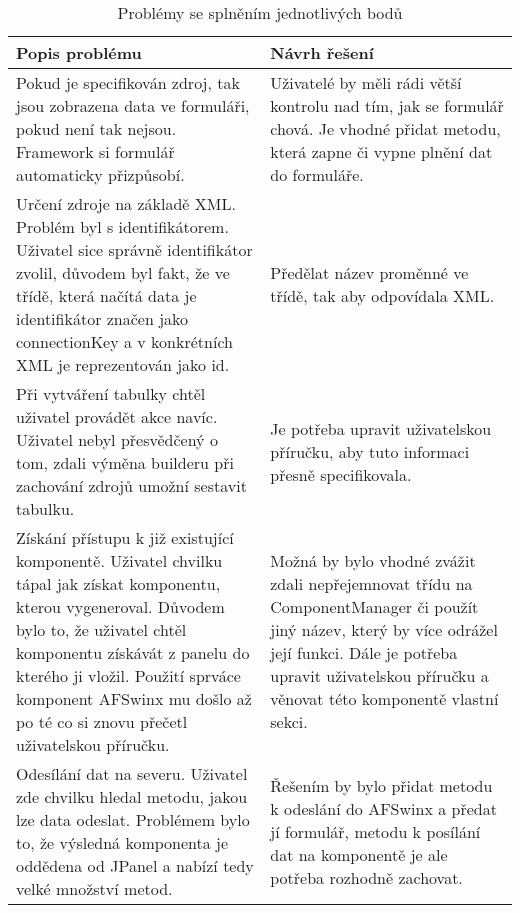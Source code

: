 \begin{table}[width=\linewidth]
\begin{center}
\caption{Problémy se splněním jednotlivých bodů}
\label{table:userTestResult}
\begin{tabular}{|p{7cm}|p{7cm}|}
\hline
\textbf{Popis problému} & \textbf{Návrh řešení} \\
\hline
Pokud je specifikován zdroj, tak jsou zobrazena data ve formuláři, pokud není tak nejsou. Framework si formulář automaticky přizpůsobí. & 
Uživatelé by měli rádi větší kontrolu nad tím, jak se formulář chová. Je vhodné přidat metodu, která zapne či vypne plnění dat do formuláře.\\
\hline
Určení zdroje na základě XML. Problém byl s identifikátorem. Uživatel sice správně identifikátor zvolil, důvodem byl fakt, že ve třídě, která načítá data je identifikátor značen jako connectionKey a v konkrétních XML je reprezentován jako id. & 
Předělat název proměnné ve třídě, tak aby odpovídala XML.\\
\hline
Při vytváření tabulky chtěl uživatel provádět akce navíc. Uživatel nebyl přesvědčený o tom, zdali výměna builderu při zachování zdrojů umožní sestavit tabulku. & Je potřeba upravit uživatelskou příručku, aby tuto informaci přesně specifikovala.\\
\hline
Získání přístupu k již existující komponentě. Uživatel chvilku tápal jak získat komponentu, kterou vygeneroval.  Důvodem bylo to, že uživatel chtěl komponentu získávát z panelu do kterého ji vložil. Použití sprváce komponent AFSwinx mu došlo až po té co si znovu přečetl uživatelskou příručku. & Možná by bylo vhodné zvážit zdali nepřejemnovat třídu na ComponentManager či použít jiný název, který by více odrážel její funkci. Dále je potřeba upravit uživatelskou příručku a věnovat této komponentě vlastní sekci.\\
\hline
Odesílání dat na severu. Uživatel zde chvilku hledal metodu, jakou lze data odeslat. Problémem bylo to, že výsledná komponenta je oddědena od JPanel a nabízí tedy velké množství metod. & Řešením by bylo přidat metodu k odeslání do AFSwinx a předat jí formulář, metodu k posílání dat na komponentě je ale potřeba rozhodně zachovat.\\
\hline
\end{tabular}
\end{center}
\end{table}
